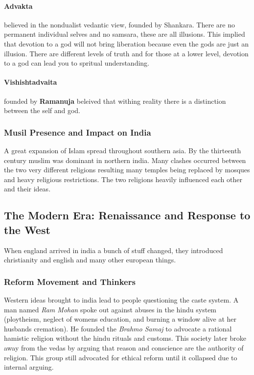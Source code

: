 \documentclass{article}
\begin{document}
\paragraph{Advakta}
\label{par:advakta}
believed in the nondualist vedantic view, founded by Shankara. There are no permanent individual selves and no samsara, these are all illusions. This implied that devotion to a god will not bring liberation because even the gods are just an illusion. There are different levels of truth and for those at a lower level, devotion to a god can lead you to spritual understanding.

\paragraph{Vishishtadvaita}
\label{par:vishishtadvaita}
founded by \textbf{Ramanuja} beleived that withing reality there is a distinction between the self and god.

\subsubsection*{Musil Presence and Impact on India}
\label{ssub:musil_presence_and_impact_on_india}
A great expansion of Islam spread throughout southern asia. By the thirteenth century muslim was dominant in northern india. Many clashes occurred between the two very different religions resulting many temples being replaced by mosques and heavy religious restrictions. The two religions heavily influenced each other and their ideas.

\subsection*{The Modern Era: Renaissance and Response to the West}
\label{sec:the_modern_era_remaossamce_amd_res}
When england arrived in india a bunch of stuff changed, they introduced christianity and english and many other european things.

\subsubsection*{Reform Movement and Thinkers}
\label{ssub:reform_movement_and_thinkers}
Western ideas brought to india lead to people questioning the caste system. A man named \emph{Ram Mohan} spoke out against abuses in the hindu system (ploytheism, neglect of womens education, and burning a window alive at her husbands cremation). He founded the \emph{Brahmo Samaj} to advocate a rational hamistic religion without the hindu rituals and customs. This society later broke away from the vedas by arguing that reason and conscience are the authority of religion. This group still advocated for ethical reform until it collapsed due to internal arguing.
\end{document}
